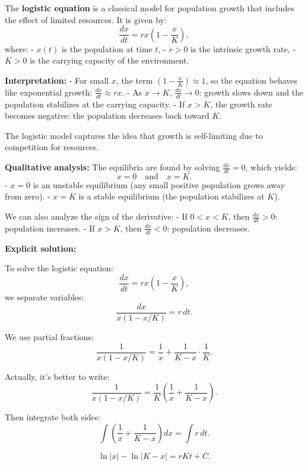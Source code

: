 
The \textbf{logistic equation} is a classical model for population growth that includes the effect of limited resources. It is given by:
\[
\frac{dx}{dt} = rx\left(1 - \frac{x}{K}\right),
\]
where:
- \( x(t) \) is the population at time \( t \),
- \( r > 0 \) is the intrinsic growth rate,
- \( K > 0 \) is the carrying capacity of the environment.

\vspace{1em}
\noindent
\textbf{Interpretation:}
- For small \( x \), the term \( \left(1 - \frac{x}{K}\right) \approx 1 \), so the equation behaves like exponential growth: \( \frac{dx}{dt} \approx rx \).
- As \( x \to K \), \( \frac{dx}{dt} \to 0 \): growth slows down and the population stabilizes at the carrying capacity.
- If \( x > K \), the growth rate becomes negative: the population decreases back toward \( K \).

The logistic model captures the idea that growth is self-limiting due to competition for resources.

\vspace{1em}
\noindent
\textbf{Qualitative analysis:}
The equilibria are found by solving \( \frac{dx}{dt} = 0 \), which yields:
\[
x = 0 \quad \text{and} \quad x = K.
\]
- \( x = 0 \) is an unstable equilibrium (any small positive population grows away from zero).
- \( x = K \) is a stable equilibrium (the population stabilizes at \( K \)).

We can also analyze the sign of the derivative:
- If \( 0 < x < K \), then \( \frac{dx}{dt} > 0 \): population increases.
- If \( x > K \), then \( \frac{dx}{dt} < 0 \): population decreases.

\vspace{1em}
\noindent
\textbf{Explicit solution:}

To solve the logistic equation:
\[
\frac{dx}{dt} = rx\left(1 - \frac{x}{K}\right),
\]
we separate variables:
\[
\frac{dx}{x(1 - x/K)} = r\,dt.
\]

We use partial fractions:
\[
\frac{1}{x(1 - x/K)} = \frac{1}{x} + \frac{1}{K - x} \cdot \frac{1}{K}.
\]

Actually, it's better to write:
\[
\frac{1}{x(1 - x/K)} = \frac{1}{K} \left( \frac{1}{x} + \frac{1}{K - x} \right).
\]

Then integrate both sides:
\[
\int \left( \frac{1}{x} + \frac{1}{K - x} \right) dx = \int r\,dt.
\]

\[
\ln|x| - \ln|K - x| = rK t + C.
\]

